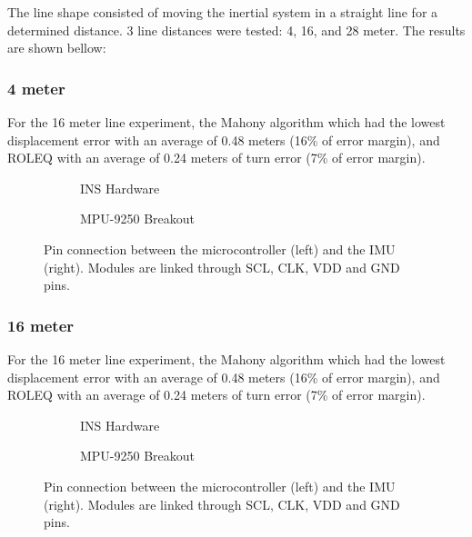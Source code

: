 The line shape consisted of moving the inertial system in a straight line for a determined distance. 3 line distances were tested: 4, 16, and 28 meter. The results are shown bellow:

\subsubsection{4 meter}

For the 16 meter line experiment, the Mahony algorithm which had the lowest displacement error with an average of 0.48 meters (16\% of error margin), and ROLEQ with an average of 0.24 meters of turn error (7\% of error margin).

\begin{figure}[!h]
    \centering
    \begin{subfigure}{0.49\textwidth}
        \centering
        \resizebox{1\linewidth}{!}{}
        \caption{INS Hardware}
        \label{fig:sub1}
    \end{subfigure}
    \begin{subfigure}{0.49\textwidth}
        \centering
        \resizebox{1\linewidth}{!}{}
        \caption{MPU-9250 Breakout}
        \label{fig:sub2}
    \end{subfigure}
    \caption{Pin connection between the microcontroller (left) and the IMU (right). Modules are linked through SCL, CLK, VDD and GND pins.}
    \label{fig:square4}
\end{figure}

\begin{figure}[!h]
    \centering
    
\end{figure}

\subsubsection{16 meter}

For the 16 meter line experiment, the Mahony algorithm which had the lowest displacement error with an average of 0.48 meters (16\% of error margin), and ROLEQ with an average of 0.24 meters of turn error (7\% of error margin).

\begin{figure}[!h]
    \centering
    \begin{subfigure}{0.49\textwidth}
        \centering
        \resizebox{1\linewidth}{!}{}
        \caption{INS Hardware}
        \label{fig:square162D}
    \end{subfigure}
    \begin{subfigure}{0.49\textwidth}
        \centering
        \resizebox{1\linewidth}{!}{}
        \caption{MPU-9250 Breakout}
        \label{fig:square163D}
    \end{subfigure}
    \caption{Pin connection between the microcontroller (left) and the IMU (right). Modules are linked through SCL, CLK, VDD and GND pins.}
    \label{fig:square16}
\end{figure}

